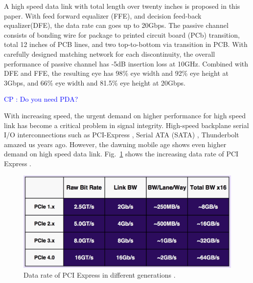 \documentclass{book}  %
\newcommand{\cphighlight}[1]{\Huge\textcolor{blue}{CP : #1}\normalsize}
\newenvironment{abstract}{\begin{piersabstract}}{%
	\end{piersabstract}\ignorespacesafterend%
}
\renewcommand{\section}[1]{\psection{#1}}
\begin{document}
\begin{paper}
	
\begin{abstract}
A high speed data link with total length over twenty inches is proposed in this paper. With feed forward equalizer (FFE), and decision feed-back equalizer(DFE), the data rate can goes up to 20Gbps. The passive channel consists of bonding wire for package to printed circuit board (PCb) transition, total 12 inches of PCB lines, and two top-to-bottom via transition in PCB. With carefully designed matching network for each discontinuity, the overall performance of passive channel has -5dB insertion loss at 10GHz. Combined with DFE and FFE, the resulting eye has 98\% eye width and 92\% eye height at 3Gbps, and 66\% eye width and 81.5\% eye height at 20Gbps. 

\cphighlight{Do you need PDA?}
\end{abstract}

\section{Introduction}
With increasing speed, the urgent demand on higher performance for high speed link has become a critical problem in signal integrity. High-speed backplane serial I/O interconnections such as PCI-Express \cite{na_welcome_pcisig}, Serial ATA (SATA) \cite{I_serial_ata}, Thunderbolt \cite{na_thunderbolt_technology} amazed us years ago. However, the dawning mobile age shows even higher demand on high speed data link. Fig.~\ref{fig:pcie_speed} shows the increasing data rate of PCI Express \cite{na_welcome_pcisig}. \\

\begin{figure}[htbp!]
	\centering
	\includegraphics[width=0.8\columnwidth]{./img/pcie-4-0-bandwidth.png}
	\caption{Data rate of PCI Express in different generations \cite{C_doublespeed_nextgen}.}
	\label{fig:pcie_speed}
\end{figure}


\end{paper}
\end{document}
